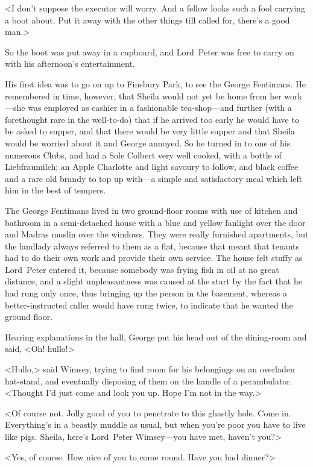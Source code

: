 <I don't suppose the executor will worry. And a fellow looks such a fool carrying a boot about. Put it away with the other things till called for, there's a good man.>

So the boot was put away in a cupboard, and Lord~Peter was free to carry on with his afternoon's entertainment.

His first idea was to go on up to Finsbury Park, to see the George Fentimans. He remembered in time, however, that Sheila would not yet be home from her work—she was employed as cashier in a fashionable tea-shop—and further (with a forethought rare in the well-to-do) that if he arrived too early he would have to be asked to supper, and that there would be very little supper and that Sheila would be worried about it and George annoyed. So he turned in to one of his numerous Clubs, and had a Sole Colbert very well cooked, with a bottle of Liebfraumilch; an Apple Charlotte and light savoury to follow, and black coffee and a rare old brandy to top up with—a simple and satisfactory meal which left him in the best of tempers.

The George Fentimans lived in two ground-floor rooms with use of kitchen and bathroom in a semi-detached house with a blue and yellow fanlight over the door and Madras muslin over the windows. They were really furnished apartments, but the landlady always referred to them as a flat, because that meant that tenants had to do their own work and provide their own service. The house felt stuffy as Lord~Peter entered it, because somebody was frying fish in oil at no great distance, and a slight unpleasantness was caused at the start by the fact that he had rung only once, thus bringing up the person in the basement, whereas a better-instructed caller would have rung twice, to indicate that he wanted the ground floor.

Hearing explanations in the hall, George put his head out of the dining-room and said, <Oh! hullo!>

<Hullo,> said Wimsey, trying to find room for his belongings on an overladen hat-stand, and eventually disposing of them on the handle of a perambulator. <Thought I'd just come and look you up. Hope I'm not in the way.>

<Of course not. Jolly good of you to penetrate to this ghastly hole. Come in. Everything's in a beastly muddle as usual, but when you're poor you have to live like pigs. Sheila, here's Lord~Peter Wimsey—you have met, haven't you?>

<Yes, of course. How nice of you to come round. Have you had dinner?>


